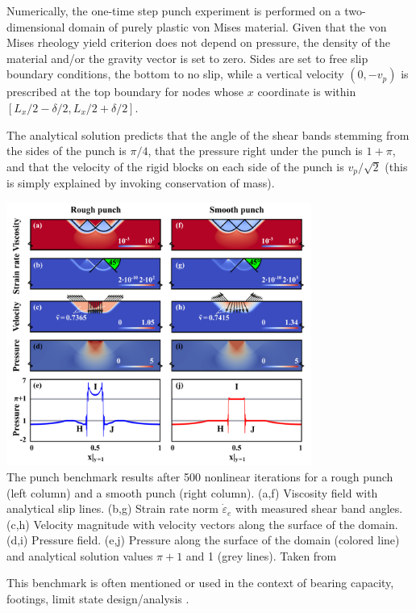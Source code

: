 Numerically, the one-time step punch experiment is performed on a two-dimensional
domain of purely plastic von Mises material. 
Given that the von Mises rheology yield criterion does not depend on pressure, the density of the material and/or the gravity vector is set to zero. Sides are set to free slip boundary conditions, the bottom to no slip, while a vertical velocity $(0,-v_p)$ is prescribed at the top boundary for nodes whose $x$ coordinate is within $[L_x/2-\delta/2,L_x/2+\delta/2]$. 

The analytical solution predicts that the angle of the shear bands stemming from the sides of the punch 
is $\pi/4$, that the pressure right under the punch is $1+\pi$, 
and that the velocity of the rigid blocks on each side of the punch is $v_p/\sqrt{2}$ 
(this is simply explained by invoking conservation of mass).


\begin{center}
\includegraphics[width=10cm]{images/benchmark_punch/gltf18}\\
{\captionfont The punch benchmark results after 500 nonlinear iterations for a rough punch (left column) 
and a smooth punch (right column). (a,f) Viscosity field with analytical slip lines. 
(b,g) Strain rate norm $\dot\varepsilon_e$ with measured shear band angles. 
(c,h) Velocity magnitude with velocity vectors along the surface of the domain.
(d,i) Pressure field. (e,j) Pressure along the surface of the domain (colored line) and analytical 
solution values $\pi + 1$ and 1 (grey lines). Taken from \cite{gltf18}}
\end{center}

\begin{remark}
This benchmark is often mentioned or used in the context of bearing capacity, footings, 
limit state design/analysis \cite{mich01,zhll03,gour04,gork06,lesk05,shls03}.
\end{remark}


